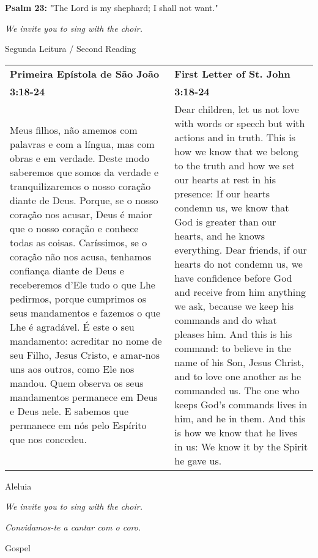 {\bf Psalm 23:} "The Lord is my shephard; I shall not want."

{\it We invite you to sing with the choir.}

\newpage
{\large Segunda Leitura / Second Reading}

\begin{longtable}{p{2in}p{2in}}
  {\bf Primeira Epístola de São João} & \hfill{\bf First Letter of St. John}\\
  {\bf 3:18-24}&\hfill{\bf 3:18-24}\\
Meus filhos,
não amemos com palavras e com a língua,
mas com obras e em verdade.
Deste modo saberemos que somos da verdade
e tranquilizaremos o nosso coração diante de Deus.
Porque, se o nosso coração nos acusar,
Deus é maior que o nosso coração
e conhece todas as coisas.
Caríssimos, se o coração não nos acusa,
tenhamos confiança diante de Deus
e receberemos d’Ele tudo o que Lhe pedirmos,
porque cumprimos os seus mandamentos
e fazemos o que Lhe é agradável.
É este o seu mandamento:
acreditar no nome de seu Filho, Jesus Cristo,
e amar-nos uns aos outros, como Ele nos mandou.
Quem observa os seus mandamentos
permanece em Deus e Deus nele.
E sabemos que permanece em nós
pelo Espírito que nos concedeu.
&
Dear children, let us not love with words or speech but with actions and in truth.
This is how we know that we belong to the truth and how we set our hearts at rest in his presence: If our hearts condemn us, we know that God is greater than our hearts, and he knows everything. Dear friends, if our hearts do not condemn us, we have confidence before God and receive from him anything we ask, because we keep his commands and do what pleases him. And this is his command: to believe in the name of his Son, Jesus Christ, and to love one another as he commanded us. The one who keeps God’s commands lives in him, and he in them. And this is how we know that he lives in us: We know it by the Spirit he gave us.
\end{longtable}

{\large Aleluia}

{\it We invite you to sing with the choir.}

{\it Convidamos-te a cantar com o coro.}


\newpage
{\large Gospel}

